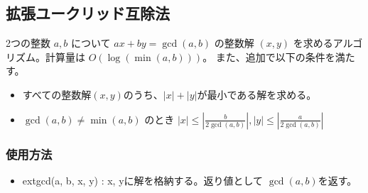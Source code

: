 \subsection{拡張ユークリッド互除法}

2つの整数 $a,b$ について $ax + by = \gcd(a,b)$ の整数解 $(x, y)$ を求めるアルゴリズム。計算量は $O(\log(\min(a,b)))$。
また、追加で以下の条件を満たす。

\begin{itemize}
    \item すべての整数解$(x,y)$のうち、$|x| + |y|$が最小である解を求める。
    \item $\gcd(a,b) \neq \min(a, b)$ のとき $|x| \le \left|\frac{b}{2\gcd(a,b)}\right|, |y| \le \left|\frac{a}{2\gcd(a,b)}\right|$
\end{itemize}

\subsubsection*{使用方法}

\begin{itemize}
    \item extgcd(a, b, x, y) : x, yに解を格納する。返り値として $\gcd(a,b)$を返す。
\end{itemize}


